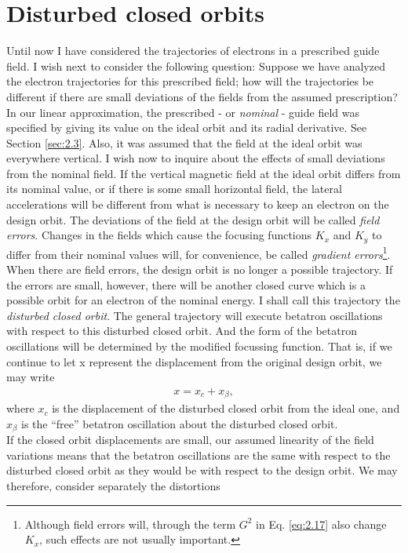 \documentclass[../sands-adaptation.tex]{subfiles}
\begin{document}
\section{Disturbed closed orbits}\label{sec:2.10}

Until now I have considered the trajectories of electrons in a prescribed guide field. I wish next to consider the following question: Suppose we have analyzed the electron trajectories for this prescribed field; how will the trajectories be different if there are small deviations of the fields from the assumed prescription? In our linear approximation, the prescribed - or \emph{nominal} - guide field was specified by giving its value on the ideal orbit and its radial derivative. See Section \ref{sec:2.3}. Also, it was assumed that the field at the ideal orbit was everywhere vertical. I wish now to inquire about the effects of small deviations from the nominal field. If the vertical magnetic field at the ideal orbit differs
 from its nominal value, or if there is some small horizontal field, the lateral accelerations
will be different from what is necessary to keep an electron on the design orbit. The deviations
 of the field at the design orbit will be called \emph{field errors}. Changes in the fields which cause the focusing functions $K_x$ and $K_y$ to differ from their nominal values will, for convenience, be called \emph{gradient errors}\footnote{Although field errors will, through the term $G^2$ in Eq. \eqref{eq:2.17} also change $K_x$, such effects are not usually important.}.\\
When there are field errors, the design orbit is no longer a possible trajectory. If the errors
 are small, however, there will be another closed curve which is a possible orbit for an electron
 of the nominal energy. I shall call this trajectory the \emph{disturbed closed orbit}. The general trajectory will execute betatron oscillations with respect to this disturbed closed orbit. And the form of the betatron oscillations will be determined by the modified focussing function. That is, if we continue to let x represent the displacement from the original design orbit, we may write
\begin{align}\label{eq:2.83}
	x = x_c + x_\beta,
\end{align}
where $x_c$ is the displacement of the disturbed closed orbit from the ideal one, and $x_\beta$ is the “free” betatron oscillation about the disturbed closed orbit.\\
If the closed orbit displacements are small, our assumed linearity of the field variations means that the betatron oscillations are the same with respect to the disturbed closed orbit as they would be with respect to the design orbit. We may therefore, consider separately the distortions
\end{document}
